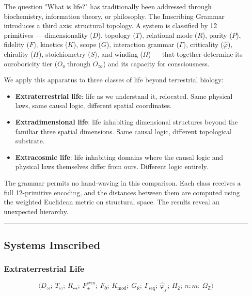 \documentclass[12pt,a4paper]{article}
\begin{document}
The question "What is life?" has traditionally been addressed through biochemistry, information theory, or philosophy. The Imscribing Grammar introduces a third axis: structural topology. A system is classified by 12 primitives --- dimensionality ($D$), topology ($T$), relational mode ($R$), parity ($P$), fidelity ($F$), kinetics ($K$), scope ($G$), interaction grammar ($\Gamma$), criticality ($\hat{\varphi}$), chirality ($H$), stoichiometry ($S$), and winding ($\Omega$) --- that together determine its ouroboricity tier ($O₀$ through $O_{\infty}$) and its capacity for consciousness.

We apply this apparatus to three classes of life beyond terrestrial biology:

\begin{itemize}
    \item \textbf{Extraterrestrial life}: life as we understand it, relocated. Same physical laws, same causal logic, different spatial coordinates.
    \item \textbf{Extradimensional life}: life inhabiting dimensional structures beyond the familiar three spatial dimensions. Same causal logic, different topological substrate.
    \item \textbf{Extracosmic life}: life inhabiting domains where the causal logic and physical laws themselves differ from ours. Different logic entirely.
\end{itemize}

The grammar permits no hand-waving in this comparison. Each class receives a full 12-primitive encoding, and the distances between them are computed using the weighted Euclidean metric on structural space. The results reveal an unexpected hierarchy.

\begin{center}
\rule{0.5\textwidth}{0.4pt}
\end{center}

\subsection{Systems Imscribed}

\subsubsection{Extraterrestrial Life}

\[\langle D_{\odot};\ T_{\odot};\ R_{\leftrightarrow};\ P_{\pm}^{\text{sym}};\ F_{\eth};\ K_{\text{mod}};\ G_{\aleph};\ \Gamma_{\text{seq}};\ \hat{\varphi}_{\text{ÿ}};\ H_2;\ n{:}m;\ \Omega_{\mathbb{Z}} \rangle\]
\end{document}
